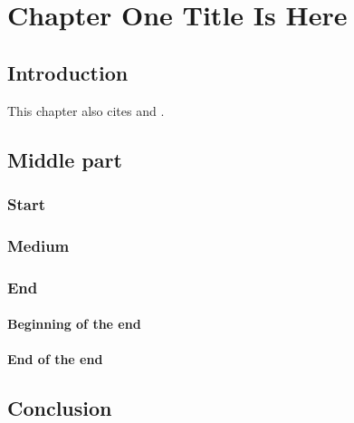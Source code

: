 \chapter[Chapter title]{Chapter One Title Is Here}

\section{Introduction}
\lipsum[1-3] 
This chapter also cites \citet{mascolell} and \citet{athey1}.

\section{Middle part}
\lipsum[10]

\lipsum[20]

\subsection{Start}
\lipsum[1-2]
\subsection{Medium}
\lipsum[1-3]
\subsection{End}
\lipsum[11-12]
\subsubsection{Beginning of the end}
\lipsum[14]
\subsubsection{End of the end}
\lipsum[15]

\section{Conclusion}
\lipsum[5-8]